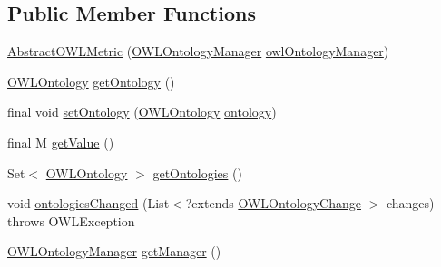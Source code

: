 \subsection*{Public Member Functions}
\begin{DoxyCompactItemize}
\item 
\hyperlink{classorg_1_1semanticweb_1_1owlapi_1_1metrics_1_1_abstract_o_w_l_metric_3_01_m_01_4_a03f1fc8fa68d7a298a141dd1d34aebdb}{Abstract\-O\-W\-L\-Metric} (\hyperlink{interfaceorg_1_1semanticweb_1_1owlapi_1_1model_1_1_o_w_l_ontology_manager}{O\-W\-L\-Ontology\-Manager} \hyperlink{classorg_1_1semanticweb_1_1owlapi_1_1metrics_1_1_abstract_o_w_l_metric_3_01_m_01_4_ad33c9afc47b32a87d47cd0c02dc120b1}{owl\-Ontology\-Manager})
\item 
\hyperlink{interfaceorg_1_1semanticweb_1_1owlapi_1_1model_1_1_o_w_l_ontology}{O\-W\-L\-Ontology} \hyperlink{classorg_1_1semanticweb_1_1owlapi_1_1metrics_1_1_abstract_o_w_l_metric_3_01_m_01_4_a26886da3d160778aca2e51cc82861b95}{get\-Ontology} ()
\item 
final void \hyperlink{classorg_1_1semanticweb_1_1owlapi_1_1metrics_1_1_abstract_o_w_l_metric_3_01_m_01_4_ab6f12915419f326fe4f5afc342571854}{set\-Ontology} (\hyperlink{interfaceorg_1_1semanticweb_1_1owlapi_1_1model_1_1_o_w_l_ontology}{O\-W\-L\-Ontology} \hyperlink{classorg_1_1semanticweb_1_1owlapi_1_1metrics_1_1_abstract_o_w_l_metric_3_01_m_01_4_a1221622fc271e61624e89ad81aaa7288}{ontology})
\item 
final M \hyperlink{classorg_1_1semanticweb_1_1owlapi_1_1metrics_1_1_abstract_o_w_l_metric_3_01_m_01_4_a011fcebbac266b90df45a12a468a817a}{get\-Value} ()
\item 
Set$<$ \hyperlink{interfaceorg_1_1semanticweb_1_1owlapi_1_1model_1_1_o_w_l_ontology}{O\-W\-L\-Ontology} $>$ \hyperlink{classorg_1_1semanticweb_1_1owlapi_1_1metrics_1_1_abstract_o_w_l_metric_3_01_m_01_4_acbb54e314b769a94a974ffc65c09e065}{get\-Ontologies} ()
\item 
void \hyperlink{classorg_1_1semanticweb_1_1owlapi_1_1metrics_1_1_abstract_o_w_l_metric_3_01_m_01_4_a5b9c2551770244f68fee246a37eac017}{ontologies\-Changed} (List$<$?extends \hyperlink{classorg_1_1semanticweb_1_1owlapi_1_1model_1_1_o_w_l_ontology_change}{O\-W\-L\-Ontology\-Change} $>$ changes)  throws O\-W\-L\-Exception 
\item 
\hyperlink{interfaceorg_1_1semanticweb_1_1owlapi_1_1model_1_1_o_w_l_ontology_manager}{O\-W\-L\-Ontology\-Manager} \hyperlink{classorg_1_1semanticweb_1_1owlapi_1_1metrics_1_1_abstract_o_w_l_metric_3_01_m_01_4_a0fd1721839a0c2cca9304406b7c0568b}{get\-Manager} ()

\end{DoxyCompactItemize}

